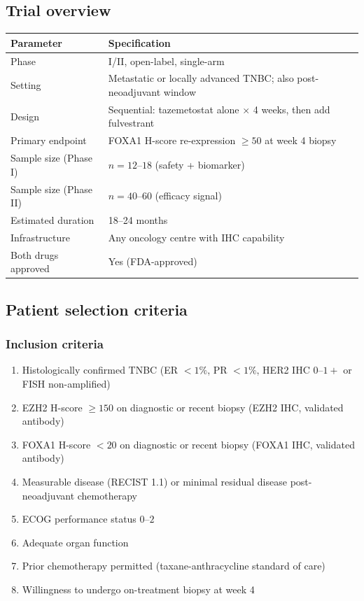 \documentclass[12pt, a4paper]{article}
\begin{document}
\subsection{Trial overview}

\begin{center}
\begin{tabular}{ll}
\toprule
\textbf{Parameter} & \textbf{Specification} \\
\midrule
Phase & I/II, open-label, single-arm \\
Setting & Metastatic or locally advanced TNBC;
          also post-neoadjuvant window \\
Design & Sequential: tazemetostat alone
         $\times$ 4 weeks, then add fulvestrant \\
Primary endpoint & FOXA1 H-score re-expression
                   $\geq 50$ at week 4 biopsy \\
Sample size (Phase I) & $n = 12$--$18$
                        (safety + biomarker) \\
Sample size (Phase II) & $n = 40$--$60$
                         (efficacy signal) \\
Estimated duration & 18--24 months \\
Infrastructure & Any oncology centre with
                 IHC capability \\
Both drugs approved & Yes (FDA-approved) \\
\bottomrule
\end{tabular}
\end{center}

\subsection{Patient selection criteria}

\subsubsection{Inclusion criteria}

\begin{enumerate}
  \item Histologically confirmed TNBC
        (ER $<1\%$, PR $<1\%$, HER2 IHC $0$--$1+$
        or FISH non-amplified)
  \item EZH2 H-score $\geq 150$ on diagnostic or
        recent biopsy (EZH2 IHC, validated antibody)
  \item FOXA1 H-score $< 20$ on diagnostic or
        recent biopsy (FOXA1 IHC, validated antibody)
  \item Measurable disease (RECIST 1.1) or
        minimal residual disease post-neoadjuvant
        chemotherapy
  \item ECOG performance status $0$--$2$
  \item Adequate organ function
  \item Prior chemotherapy permitted
        (taxane-anthracycline standard of care)
  \item Willingness to undergo on-treatment biopsy
        at week 4
\end{enumerate}
\end{document}
